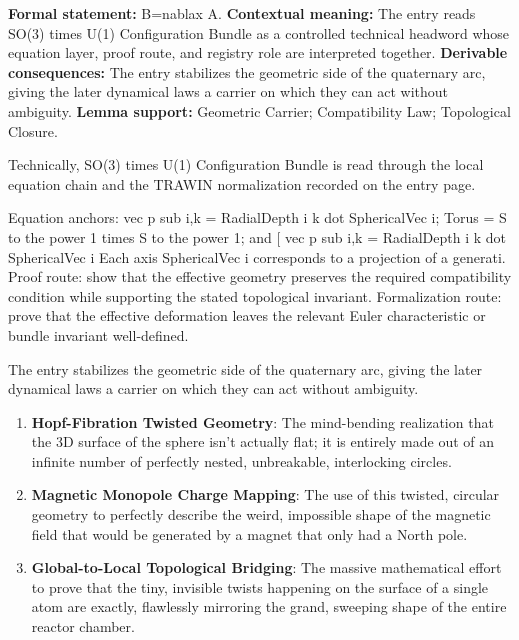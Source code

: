 \begingroup\footnotesize\setlength{\emergencystretch}{3em}\sloppy
\textbf{Formal statement:} B=nablax A. \textbf{Contextual meaning:} The entry reads SO(3) times U(1) Configuration Bundle as a controlled technical headword whose equation layer, proof route, and registry role are interpreted together. \textbf{Derivable consequences:} The entry stabilizes the geometric side of the quaternary arc, giving the later dynamical laws a carrier on which they can act without ambiguity. \textbf{Lemma support:} Geometric Carrier; Compatibility Law; Topological Closure.\par
\endgroup

Technically, SO(3) times U(1) Configuration Bundle is read through the local equation chain and the TRAWIN normalization recorded on the entry page.

Equation anchors: vec p sub i,k = RadialDepth i k dot SphericalVec i; Torus = S to the power 1 times S to the power 1; and [ vec p sub i,k = RadialDepth i k dot SphericalVec i Each axis SphericalVec i corresponds to a projection of a generati. Proof route: show that the effective geometry preserves the required compatibility condition while supporting the stated topological invariant. Formalization route: prove that the effective deformation leaves the relevant Euler characteristic or bundle invariant well-defined.

The entry stabilizes the geometric side of the quaternary arc, giving the later dynamical laws a carrier on which they can act without ambiguity.
\endgroup

\begin{enumerate}[leftmargin=1.6em,itemsep=6pt,topsep=4pt]
\item \textbf{Hopf-Fibration Twisted Geometry}: The mind-bending realization that the 3D surface of the sphere isn't actually flat; it is entirely made out of an infinite number of perfectly nested, unbreakable, interlocking circles.
\item \textbf{Magnetic Monopole Charge Mapping}: The use of this twisted, circular geometry to perfectly describe the weird, impossible shape of the magnetic field that would be generated by a magnet that only had a North pole.
\item \textbf{Global-to-Local Topological Bridging}: The massive mathematical effort to prove that the tiny, invisible twists happening on the surface of a single atom are exactly, flawlessly mirroring the grand, sweeping shape of the entire reactor chamber.
\end{enumerate}

